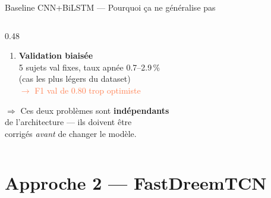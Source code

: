 \documentclass[aspectratio=169, 10pt]{beamer}
\begin{document}
\begin{frame}{Baseline CNN+BiLSTM — Pourquoi ça ne généralise pas}
\begin{columns}[T]
\begin{column}{0.48\textwidth}
\begin{enumerate}
                \item \textbf{Validation biaisée}\\
                      5 sujets val fixes, taux apnée 0.7--2.9\,\%\\
                      (cas les plus légers du dataset)\\
                      \textcolor{Coral}{$\to$ F1 val de 0.80 trop optimiste}
            \end{enumerate}
            \vspace{0.2cm}
            \textcolor{MidGray}{\small
            $\Rightarrow$ Ces deux problèmes sont \textbf{indépendants}\\
            de l'architecture — ils doivent être\\
            corrigés \textit{avant} de changer le modèle.}
        \end{column}
    \end{columns}
\end{frame}

\section{Approche 2 — FastDreemTCN}
\end{document}
